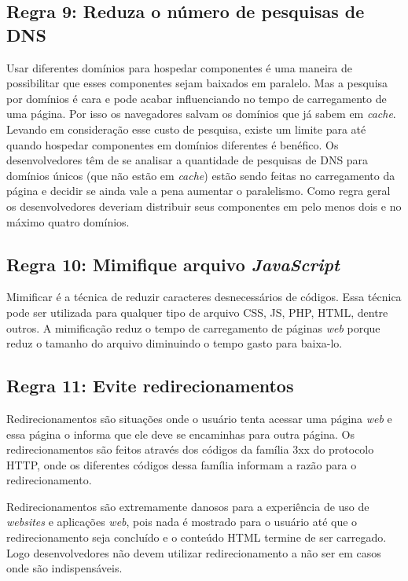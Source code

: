 \subsection{Regra 9: Reduza o número de pesquisas de DNS}
\label{subsec:highperformance_regra9}
Usar diferentes domínios para hospedar componentes é uma maneira de possibilitar que esses componentes sejam baixados em paralelo. Mas a pesquisa por domínios é cara e pode acabar influenciando no tempo de carregamento de uma página. Por isso os navegadores salvam os domínios que já sabem em \textit{cache}. Levando em consideração esse custo de pesquisa, existe um limite para até quando hospedar componentes em domínios diferentes é benéfico. Os desenvolvedores têm de se analisar a quantidade de pesquisas de DNS para domínios únicos (que não estão em \textit{cache}) estão sendo feitas no carregamento da página e decidir se ainda vale a pena aumentar o paralelismo. Como regra geral os desenvolvedores deveriam distribuir seus componentes em pelo menos dois e no máximo quatro domínios.

\subsection{Regra 10: Mimifique arquivo \textit{JavaScript}}
\label{subsec:highperformance_regra10}
Mimificar é a técnica de reduzir caracteres desnecessários de códigos. Essa técnica pode ser utilizada para qualquer tipo de arquivo CSS, JS, PHP, HTML, dentre outros. A mimificação reduz o tempo de carregamento de páginas \textit{web} porque reduz o tamanho do arquivo diminuindo o tempo gasto para baixa-lo.

\subsection{Regra 11: Evite redirecionamentos}
\label{subsec:highperformance_regra11}
Redirecionamentos são situações onde o usuário tenta acessar uma página \textit{web} e essa página o informa que ele deve se encaminhas para outra página. Os redirecionamentos são feitos através dos códigos da família 3xx do protocolo HTTP, onde os diferentes códigos dessa família informam a razão para o redirecionamento.

Redirecionamentos são extremamente danosos para a experiência de uso de \textit{websites} e aplicações \textit{web}, pois nada é mostrado para o usuário até que o redirecionamento seja concluído e o conteúdo HTML termine de ser carregado. Logo desenvolvedores não devem utilizar redirecionamento a não ser em casos onde são indispensáveis.

